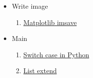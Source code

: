 \documentclass[]{article}
\begin{document}
\begin{itemize}
\begin{enumerate}
  \end{enumerate}
  \item Write image
  \begin{enumerate}
    \item \href{https://matplotlib.org/stable/api/_as_gen/matplotlib.pyplot.imsave.html}{Matplotlib imsave}
  \end{enumerate}
  \item Main
  \begin{enumerate}
    \item \href{https://www.freecodecamp.org/news/python-switch-statement-switch-case-example/}{Switch case in Python}
    \item \href{https://www.w3schools.com/python/ref_list_extend.asp}{List extend}
  \end{enumerate}
\end{itemize}
 
\end{document}
